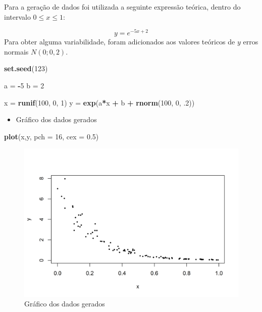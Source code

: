 \documentclass[a4paper]{article}
\newenvironment{Shaded}{\begin{snugshade}}{\end{snugshade}}
\newcommand{\KeywordTok}[1]{\textcolor[rgb]{0.13,0.29,0.53}{\textbf{#1}}}
\newcommand{\DataTypeTok}[1]{\textcolor[rgb]{0.13,0.29,0.53}{#1}}
\newcommand{\DecValTok}[1]{\textcolor[rgb]{0.00,0.00,0.81}{#1}}
\newcommand{\FloatTok}[1]{\textcolor[rgb]{0.00,0.00,0.81}{#1}}
\newcommand{\StringTok}[1]{\textcolor[rgb]{0.31,0.60,0.02}{#1}}
\newcommand{\OperatorTok}[1]{\textcolor[rgb]{0.81,0.36,0.00}{\textbf{#1}}}
\newcommand{\NormalTok}[1]{#1}
\providecommand{\tightlist}{%
  \setlength{\itemsep}{0pt}\setlength{\parskip}{0pt}}
\begin{document}
Para a geração de dados foi utilizada a seguinte expressão teórica,
dentro do intervalo \(0 \leqslant x \leqslant 1\):

\[y = e^{-5x + 2}\] Para obter alguma variabilidade, foram adicionados
aos valores teóricos de \(y\) erros normais \(N(0;0,2)\).

\begin{Shaded}
\begin{Highlighting}[]
\KeywordTok{set.seed}\NormalTok{(}\DecValTok{123}\NormalTok{)}

\NormalTok{a =}\StringTok{ }\OperatorTok{-}\DecValTok{5}
\NormalTok{b =}\StringTok{ }\DecValTok{2}

\NormalTok{x =}\StringTok{ }\KeywordTok{runif}\NormalTok{(}\DecValTok{100}\NormalTok{, }\DecValTok{0}\NormalTok{, }\DecValTok{1}\NormalTok{)}
\NormalTok{y =}\StringTok{ }\KeywordTok{exp}\NormalTok{(a}\OperatorTok{*}\NormalTok{x }\OperatorTok{+}\StringTok{ }\NormalTok{b }\OperatorTok{+}\StringTok{ }\KeywordTok{rnorm}\NormalTok{(}\DecValTok{100}\NormalTok{, }\DecValTok{0}\NormalTok{, .}\DecValTok{2}\NormalTok{))}
\end{Highlighting}
\end{Shaded}

\begin{itemize}
\tightlist
\item
  Gráfico dos dados gerados
\end{itemize}

\begin{Shaded}
\begin{Highlighting}[]
\KeywordTok{plot}\NormalTok{(x,y, }\DataTypeTok{pch =} \DecValTok{16}\NormalTok{, }\DataTypeTok{cex =} \FloatTok{0.5}\NormalTok{)}
\end{Highlighting}
\end{Shaded}

\begin{figure}[H]

{\centering \includegraphics[width=0.7\linewidth]{images/grafico-1} 

}

\caption{Gráfico dos dados gerados}\label{fig:grafico}
\end{figure}
\end{document}
